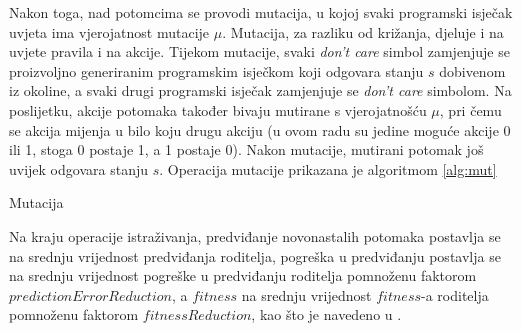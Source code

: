 \documentclass[times, utf8, zavrsni]{fer}
\begin{document}
Nakon toga, nad potomcima se provodi mutacija, u kojoj svaki programski isječak uvjeta ima vjerojatnost mutacije $\mu$.
Mutacija, za razliku od križanja, djeluje i na uvjete pravila i na akcije.
Tijekom mutacije, svaki \emph{don't care} simbol zamjenjuje se proizvoljno generiranim programskim isječkom koji odgovara stanju $s$ dobivenom iz okoline, a svaki drugi programski isječak zamjenjuje se \emph{don't care} simbolom.
Na poslijetku, akcije potomaka također bivaju mutirane s vjerojatnošću $\mu$, pri čemu se akcija mijenja u bilo koju drugu akciju (u ovom radu su jedine moguće akcije 0 ili 1, stoga 0 postaje 1, a 1 postaje 0).
Nakon mutacije, mutirani potomak još uvijek odgovara stanju $s$.
Operacija mutacije prikazana je algoritmom \ref{alg:mut}
\begin{algorithm}[h]
\caption{Mutacija}
\label{alg:mut}
\begin{algorithmic}
\STATE{$r :=$ proizvoljan decimalni broj iz intervala [0, 1)}
\REPEAT
{}
\ELSE
{}
\ENDIF
\ENDIF
\ENDFOR
\STATE{$r :=$ proizvoljan decimalni broj iz intervala [0, 1)}
\ENDIF
\end{algorithmic}
\end{algorithm}

Na kraju operacije istraživanja, predviđanje novonastalih potomaka postavlja se na srednju vrijednost predviđanja roditelja, pogreška u predviđanju postavlja se na srednju vrijednost pogreške u predviđanju roditelja pomnoženu faktorom $predictionErrorReduction$, a $fitness$ na srednju vrijednost $fitness$-a roditelja pomnoženu faktorom $fitnessReduction$, kao što je navedeno u \citep{4}.
\end{document}
